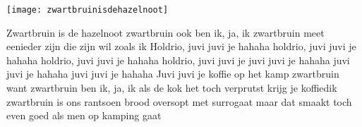 \begin{intersong}
    \texttt{[image: zwartbruinisdehazelnoot]}
\end{intersong}
\beginverse*
Zwartbruin is de hazelnoot
zwartbruin ook ben ik, ja, ik
zwartbruin meet eenieder zijn
die zijn wil zoals ik
\endverse
\beginchorus
Holdrio, juvi juvi je hahaha
holdrio, juvi juvi je hahaha
holdrio, juvi juvi je hahaha
holdrio, juvi juvi je
juvi juvi je hahaha
juvi juvi je hahaha
juvi juvi je hahaha
Juvi juvi je
\endchorus
\beginverse*
koffie op het kamp zwartbruin
want zwartbruin ben ik, ja, ik
als de kok het toch verprutst
krijg je koffiedik
\endverse
\beginverse*
zwartbruin is ons rantsoen brood
oversopt met surrogaat
maar dat smaakt toch even goed
als men op kamping gaat
\endverse
\endsong